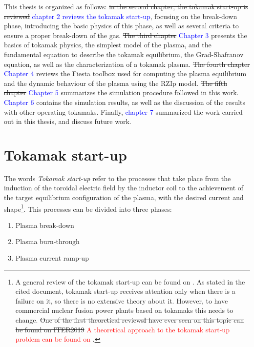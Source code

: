 \documentclass[a4paper,12pt,oneside]{book}
\begin{document}
This thesis is organized as follows: \st{in the second chapter, the tokamak start-up is reviewed} \textcolor{blue}{chapter 2 reviews the tokamak start-up}, focusing on the break-down phase, introducing the basic physics of this phase, as well as several criteria to ensure a proper break-down of the gas.
\st{The third chapter} \textcolor{blue}{Chapter 3} presents the basics of tokamak physics, the simplest model of the plasma, and the fundamental equation to describe the tokamak equilibrium, the Grad-Shafranov equation, as well as the characterization of a tokamak plasma. 
\st{The fourth chapter} \textcolor{blue}{Chapter 4} reviews the Fiesta toolbox used for computing the plasma equilibrium and the dynamic behaviour of the plasma using the RZIp model.
\st{The fifth chapter} \textcolor{blue}{Chapter 5} summarizes the simulation procedure followed in this work.
\textcolor{blue}{Chapter 6} contains the simulation results, as well as the discussion of the results with other operating tokamaks.
Finally, \textcolor{blue}{chapter 7} summarized the work carried out in this thesis, and discuss future work.





\chapter{Tokamak start-up}

The words \textit{Tokamak start-up} refer to the processes that take place from the induction of the toroidal electric field by the inductor coil to the achievement of the target equilibrium configuration of the plasma, with the desired current and shape\footnote{A general review of the tokamak start-up can be found on \cite{MuellerStartup}. As stated in the cited document, tokamak start-up receives attention only when there is a failure on it, so there is no extensive theory about it. However, to have commercial nuclear fusion power plants based on tokamaks this needs to change. \st{One of the first theoretical reviewsI have ever seen on this topic can be found on ITER2019} \textcolor{red}{A theoretical approach to the tokamak start-up problem can be found on \cite{ITER_2019}}.}. This processes can be divided into three phases:
%
%
\begin{enumerate}
	\item Plasma break-down
	\item Plasma burn-through
	\item Plasma current ramp-up
\end{enumerate}
\end{document}
